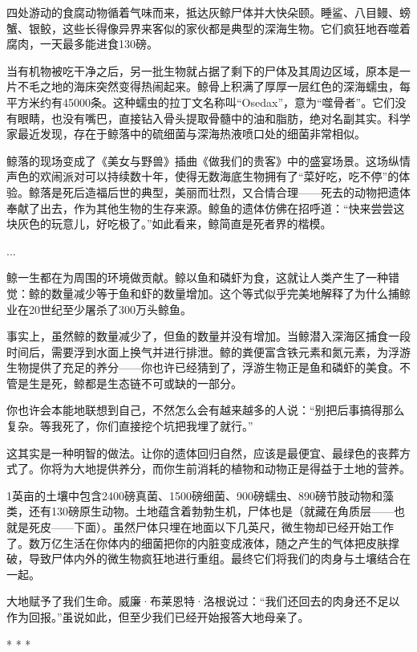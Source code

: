 \documentclass[12pt,oneside]{book}
\begin{document}
四处游动的食腐动物循着气味而来，抵达灰鲸尸体并大快朵颐。睡鲨、八目鳗、螃蟹、银鲛，这些长得像异界来客似的家伙都是典型的深海生物。它们疯狂地吞噬着腐肉，一天最多能进食130磅。

当有机物被吃干净之后，另一批生物就占据了剩下的尸体及其周边区域，原本是一片不毛之地的海床突然变得热闹起来。鲸骨上积满了厚厚一层红色的深海蠕虫，每平方米约有45000条。这种蠕虫的拉丁文名称叫“Osedax”，意为“噬骨者”。它们没有眼睛，也没有嘴巴，直接钻入骨头提取骨髓中的油和脂肪，绝对名副其实。科学家最近发现，存在于鲸落中的硫细菌与深海热液喷口处的细菌非常相似。

鲸落的现场变成了《美女与野兽》插曲《做我们的贵客》中的盛宴场景。这场纵情声色的欢闹派对可以持续数十年，使得无数海底生物拥有了“菜好吃，吃不停”的体验。鲸落是死后造福后世的典型，美丽而壮烈，又合情合理——死去的动物把遗体奉献了出去，作为其他生物的生存来源。鲸鱼的遗体仿佛在招呼道：“快来尝尝这块灰色的玩意儿，好吃极了。”如此看来，鲸简直是死者界的楷模。

...

鲸一生都在为周围的环境做贡献。鲸以鱼和磷虾为食，这就让人类产生了一种错觉：鲸的数量减少等于鱼和虾的数量增加。这个等式似乎完美地解释了为什么捕鲸业在20世纪至少屠杀了300万头鲸鱼。

事实上，虽然鲸的数量减少了，但鱼的数量并没有增加。当鲸潜入深海区捕食一段时间后，需要浮到水面上换气并进行排泄。鲸的粪便富含铁元素和氮元素，为浮游生物提供了充足的养分——你也许已经猜到了，浮游生物正是鱼和磷虾的美食。不管是生是死，鲸都是生态链不可或缺的一部分。

你也许会本能地联想到自己，不然怎么会有越来越多的人说：“别把后事搞得那么复杂。等我死了，你们直接挖个坑把我埋了就行。”

这其实是一种明智的做法。让你的遗体回归自然，应该是最便宜、最绿色的丧葬方式了。你将为大地提供养分，而你生前消耗的植物和动物正是得益于土地的营养。

1英亩的土壤中包含2400磅真菌、1500磅细菌、900磅蠕虫、890磅节肢动物和藻类，还有130磅原生动物。土地蕴含着勃勃生机，尸体也是（就藏在角质层——也就是死皮——下面）。虽然尸体只埋在地面以下几英尺，微生物却已经开始工作了。数万亿生活在你体内的细菌把你的内脏变成液体，随之产生的气体把皮肤撑破，导致尸体内外的微生物疯狂地进行重组。最终它们将我们的肉身与土壤结合在一起。

大地赋予了我们生命。威廉·布莱恩特·洛根说过：“我们还回去的肉身还不足以作为回报。”虽说如此，但至少我们已经开始报答大地母亲了。

\begin{center}
* * *
\end{center}
\end{document}
